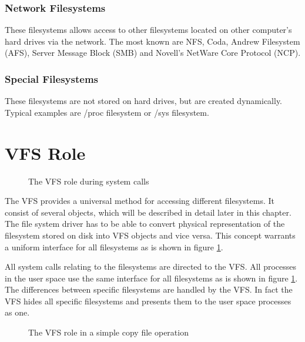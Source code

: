 \subsubsection*{Network Filesystems}
These filesystems allows access to other filesystems located on other computer's hard
drives via the network. The most known are NFS, Coda, Andrew Filesystem (AFS), Server
Message Block (SMB) and Novell's NetWare Core Protocol (NCP).

\subsubsection*{Special Filesystems}
These filesystems are not stored on hard drives, but are created dynamically. Typical
examples are /proc filesystem or /sys filesystem.

\section{VFS Role}

\begin{figure}[h]
	\begin{center}
		
	\end{center}
	\caption{The VFS role during system calls}
	\label{fig:vfs_role}
\end{figure}

The VFS provides a universal method for accessing different filesystems. It consist of
several objects, which will be described in detail later in this chapter. The file
system driver has to be able to convert physical representation of the filesystem
stored on disk into VFS objects and vice versa. This concept warrants a uniform
interface for all filesystems as is shown in figure \ref{fig:vfs_role}.

All system calls relating to the filesystems are directed to the VFS. All processes
in the user space use the same interface for all filesystems as is shown in figure
\ref{fig:vfs_role}. The differences between specific filesystems are handled by the VFS.
In fact the VFS hides all specific filesystems and presents them to the user space
processes as one.

\begin{figure}[h]
	\begin{center}
		
	\end{center}
	\caption{The VFS role in a simple copy file operation}
	\label{fig:vfs_copy}
\end{figure}


